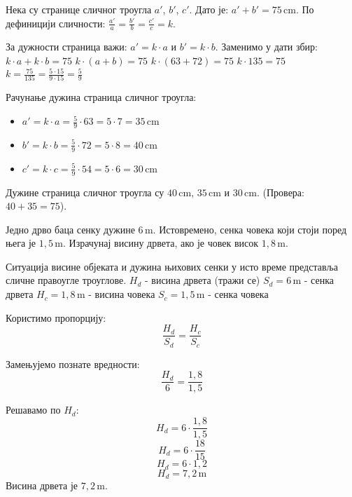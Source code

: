 \documentclass[10pt,a5paper,addpoints,answers]{exam}
\def\measure#1#2{#1 \, \mathrm{#2}}
\begin{document}
\begin{questions}
\begin{solution}[\stretch 8]
  Нека су странице сличног троугла $a'$, $b'$, $c'$.
  Дато је: $a'+b' = 75\,\mathrm{cm}$.
  По дефиницији сличности: $\frac{a'}{a} = \frac{b'}{b} = \frac{c'}{c} = k$.

  За дужности страница важи: $a' = k \cdot a$ и $b' = k \cdot b$.
  Заменимо у дати збир:
  $k \cdot a + k \cdot b = 75$
  $k \cdot (a + b) = 75$
  $k \cdot (63 + 72) = 75$
  $k \cdot 135 = 75$
  $k = \frac{75}{135} = \frac{5 \cdot 15}{9 \cdot 15} = \frac{5}{9}$

  Рачунање дужина страница сличног троугла:
  \begin{itemize}
      \item $a' = k \cdot a = \frac{5}{9} \cdot 63 = 5 \cdot 7 = \measure{35}{cm}$
      \item $b' = k \cdot b = \frac{5}{9} \cdot 72 = 5 \cdot 8 = \measure{40}{cm}$
      \item $c' = k \cdot c = \frac{5}{9} \cdot 54 = 5 \cdot 6 = \measure{30}{cm}$
  \end{itemize}
  Дужине страница сличног троугла су $\measure{40}{cm}$, $\measure{35}{cm}$ и $\measure{30}{cm}$. (Провера: $40+35=75$).
 \end{solution}
 \answerline

\ifprintanswers\else\newpage\fi %

\question[4]
 Једно дрво баца сенку дужине
 $\measure{6}{m}$.
 Истовремено, сенка човека који стоји поред њега је
 $\measure{1{,}5}{m}$.
 Израчунај висину дрвета, ако је човек висок
 $\measure{1{,}8}{m}$.
 \begin{solution}[\stretch 5] %
  Ситуација висине објеката и дужина њихових сенки у исто време представља сличне правоугле троуглове.
  $H_d$ - висина дрвета (тражи се)
  $S_d = \measure{6}{m}$ - сенка дрвета
  $H_c = \measure{1{,}8}{m}$ - висина човека
  $S_c = \measure{1{,}5}{m}$ - сенка човека

  Користимо пропорцију:
  $$ \frac{H_d}{S_d} = \frac{H_c}{S_c} $$

  Замењујемо познате вредности:
  $$ \frac{H_d}{6} = \frac{1{,}8}{1{,}5} $$

  Решавамо по $H_d$:
  $$ H_d = 6 \cdot \frac{1{,}8}{1{,}5} $$
  $$ H_d = 6 \cdot \frac{18}{15} $$
  $$ H_d = 6 \cdot 1{,}2 $$
  $$ H_d = \measure{7{,}2}{m} $$
  Висина дрвета је $\measure{7{,}2}{m}$.
 \end{solution}
 \answerline


\end{questions}
\end{document}
